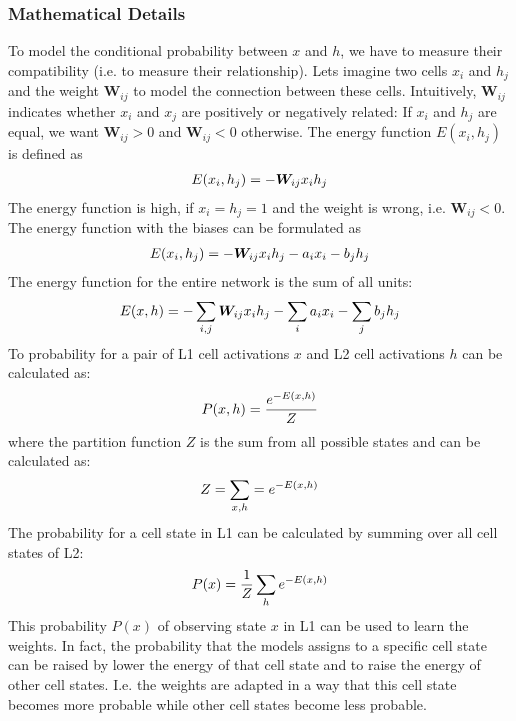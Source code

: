 \subsubsection{Mathematical Details}
To model the conditional probability between $x$ and $h$, we have to measure their compatibility (i.e. to measure their relationship).
Lets imagine two cells $x_i$ and $h_j$ and the weight $\boldsymbol{W}_{ij}$ to model the connection between these cells.
Intuitively, $\boldsymbol{W}_{ij}$ indicates whether $x_i$ and $x_j$ are positively or negatively related: If $x_i$ and $h_j$ are equal, we want $\boldsymbol{W}_{ij} > 0$ and $\boldsymbol{W}_{ij} < 0$ otherwise.
The energy function $E(x_i, h_j)$ is defined as
\begin{align}\eqlbl{l2_energy}
	E(x_i, h_j) = - \boldsymbol{W}_{ij}x_ih_j
\end{align}
The energy function is high, if $x_i=h_j=1$ and the weight is wrong, i.e. $\boldsymbol{W}_{ij} < 0$. The energy function with the biases can be formulated as
\begin{align}\eqlbl{l2_energy2}
	E(x_i, h_j) = - \boldsymbol{W}_{ij}x_ih_j - a_ix_i - b_jh_j
\end{align}
The energy function for the entire network is the sum of all units:
\begin{align}\eqlbl{l2_energy3}
	E(x, h) = - \sum_{i,j} \boldsymbol{W}_{ij}x_ih_j - \sum_ia_ix_i - \sum_jb_jh_j
\end{align}
To probability for a pair of L1 cell activations $x$ and L2 cell activations $h$ can be calculated as:
\begin{align}\eqlbl{l2_energy4}
	P(x,h) = \frac{e^{-E(x, h)}}{Z}
\end{align}
where the partition function $Z$ is the sum from all possible states and can be calculated as:
\begin{align}\eqlbl{l2_energy5}
	Z = \sum_{x,h} = e^{-E(x,h)}
\end{align}
The probability for a cell state in L1 can be calculated by summing over all cell states of L2:
\begin{align}\eqlbl{l2_energy6}
	P(x) = \frac{1}{Z} \sum_{h}e^{-E(x,h)}
\end{align}
This probability $P(x)$ of observing state $x$ in L1 can be used to learn the weights. In fact, the probability that the models assigns to a specific cell state can be raised by lower the energy of that cell state and to raise the energy of other cell states. I.e. the weights are adapted in a way that this cell state becomes more probable while other cell states become less probable.
